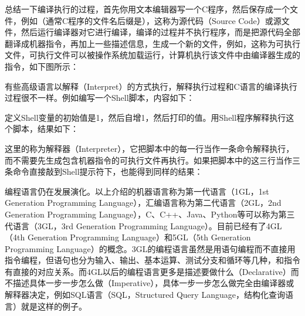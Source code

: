 总结一下编译执行的过程，首先你用文本编辑器写一个C程序，然后保存成一个文件，例如（通常C程序的文件名后缀是），这称为源代码（Source Code）或源文件，然后运行编译器对它进行编译，编译的过程并不执行程序，而是把源代码全部翻译成机器指令，再加上一些描述信息，生成一个新的文件，例如，这称为可执行文件，可执行文件可以被操作系统加载运行，计算机执行该文件中由编译器生成的指令，如下图所示：




有些高级语言以解释（Interpret）的方式执行，解释执行过程和C语言的编译执行过程很不一样。例如编写一个Shell脚本，内容如下：




定义Shell变量的初始值是1，然后自增1，然后打印的值。用Shell程序解释执行这个脚本，结果如下：




这里的称为解释器（Interpreter），它把脚本中的每一行当作一条命令解释执行，而不需要先生成包含机器指令的可执行文件再执行。如果把脚本中的这三行当作三条命令直接敲到Shell提示符下，也能得到同样的结果：





编程语言仍在发展演化。以上介绍的机器语言称为第一代语言（1GL，1st Generation Programming Language），汇编语言称为第二代语言（2GL，2nd Generation Programming Language），C、C+\BookSplit{}+\BookSplit{}、Java、Python等可以称为第三代语言（3GL，3rd Generation Programming Language）。目前已经有了4GL（4th Generation Programming Language）和5GL（5th Generation Programming Language）的概念。3GL的编程语言虽然是用语句编程而不直接用指令编程，但语句也分为输入、输出、基本运算、测试分支和循环等几种，和指令有直接的对应关系。而4GL以后的编程语言更多是描述要做什么（Declarative）而不描述具体一步一步怎么做（Imperative），具体一步一步怎么做完全由编译器或解释器决定，例如SQL语言（SQL，Structured Query Language，结构化查询语言）就是这样的例子。


